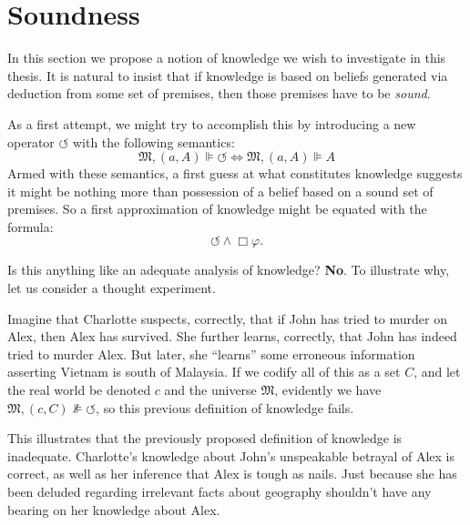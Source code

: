 \documentclass[11pt,titlepage]{report}
\numberwithin{equation}{subsection}
\renewcommand\subsection{\section}
\renewcommand{\Omega}{\mathfrak{M}}
\renewcommand{\phi}{\varphi}
\begin{document}
\subsection{Soundness}\label{soundness}
In this section we propose a notion of knowledge we wish to
investigate in this thesis.  It is natural to insist that if knowledge is based on beliefs
generated via deduction from some set of premises, then those premises
have to be \emph{sound}. 

As a first attempt, we might try to accomplish this by introducing a
new operator $\circlearrowleft$ with the following semantics:
\[ \Omega,(a,A)\VDash \circlearrowleft \iff \Omega,(a,A)\VDash A\]
Armed with these semantics, a first guess at what constitutes
knowledge suggests it might be nothing more than possession of a
belief based on a sound set of premises. So a first approximation of
knowledge might be equated with the formula:
$$\circlearrowleft \wedge \Box \phi.$$

Is this anything like an adequate analysis of knowledge?
\textbf{No}. To illustrate why, let us consider a thought
experiment.

Imagine that Charlotte suspects, correctly, that if John has tried to murder
on Alex, then Alex has survived.  She further learns, correctly, that John
has indeed tried to murder Alex.  But later, she ``learns'' some erroneous
information asserting Vietnam is south of Malaysia.  If we codify all of this as
a set $C$, and let the real world be
denoted $c$ and the universe $\Omega$, evidently we have $\Omega, (c, C) \nVDash
\circlearrowleft$, so this previous definition of knowledge fails.  

This illustrates that the previously proposed definition of knowledge
is inadequate. Charlotte's knowledge about John's unspeakable
betrayal of Alex is correct, as well as her inference that Alex is tough as
nails.  Just because she has been deluded regarding irrelevant facts
about geography shouldn't have any bearing on her
knowledge about Alex.
\end{document}
